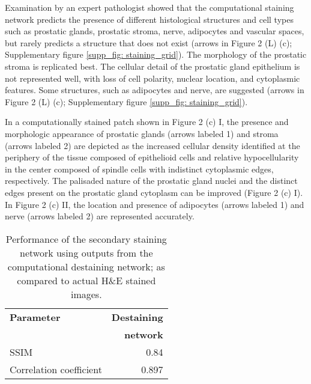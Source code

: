 \documentclass[10pt, conference, compsocconf]{IEEEtran}
\begin{document}
Examination by an expert pathologist showed that the computational staining network predicts the presence of different histological structures and cell types such as prostatic glands, prostatic stroma, nerve, adipocytes and vascular spaces, but rarely predicts a structure that does not exist (arrows in Figure 2 (L) (c); Supplementary figure \ref{supp_fig: staining_grid}). The morphology of the prostatic stroma is replicated best. The cellular detail of the prostatic gland epithelium is not represented well, with loss of cell polarity, nuclear location, and cytoplasmic features. Some structures, such as adipocytes and nerve, are suggested (arrows in Figure 2 (L) (c); Supplementary figure \ref{supp_fig: staining_grid}).

In a computationally stained patch shown in Figure 2 (c) I, the presence and morphologic appearance of prostatic glands (arrows labeled 1) and stroma (arrows labeled 2) are depicted as the increased cellular density identified at the periphery of the tissue composed of epithelioid cells and relative hypocellularity in the center composed of spindle cells with indistinct cytoplasmic edges, respectively. The palisaded nature of the prostatic gland nuclei and the distinct edges present on the prostatic gland cytoplasm can be improved (Figure 2 (c) I). In Figure 2 (c) II, the location and presence of adipocytes (arrows labeled 1) and nerve (arrows labeled 2) are represented accurately. 

\begin{table}
    \caption{Performance of the secondary staining network using outputs from the computational destaining network; as compared to actual H\&E stained images.}
    \begin{tabular*}{\linewidth}{l @{\extracolsep{\fill}}r}
        \hline
        \textbf{Parameter} & \textbf{Destaining} \\
        & \textbf{network} \\
        \hline
        SSIM 					& 0.84 \\
        Correlation coefficient & 0.897 \\
        \hline
    \end{tabular*}
    \label{table: destaining_model_results}
\end{table}
\end{document}
